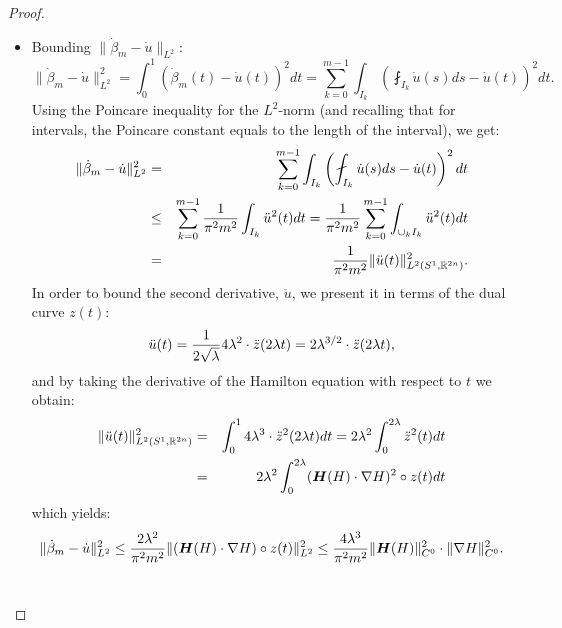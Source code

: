 \documentclass[../capacities_main.tex]{subfiles}
\begin{document}
\begin{proof}
\begin{itemize}
	 \item Bounding $\|\dot\beta_m-\dot u\|_{L^2}$:
		\[
		\|\dot\beta_m-\dot u\|_{L^2}^2 = \int_0^1 (\dot\beta_m(t)-\dot u(t))^2 dt = \sum_{k=0}^{m-1} \int_{I_k} \left( \fint_{I_k}\dot u(s) ds-\dot u(t)\right)^2 dt.
		\]
		Using the Poincare inequality for the $L^2$-norm (and recalling that for intervals, the Poincare constant equals to the length of the interval), we get:
		\begin{eqnarray*}
		 	\|\dot\beta_m-\dot u\|_{L^2}^2 &=& \sum_{k=0}^{m-1} \int_{I_k} \left( \fint_{I_k}\dot u(s) ds-\dot u(t)\right)^2 dt\\
		 	&\leq& \sum_{k=0}^{m-1} \frac{1}{\pi^2 m^2}\int_{I_k} \ddot u^2(t)dt =  \frac{1}{\pi^2 m^2}\sum_{k=0}^{m-1}  \int_{\cup_k I_k} \ddot u^2(t)dt\\
		 	&=& \frac{1}{\pi^2 m^2} \|\ddot u(t)\|_{L^2(S^1,\R^{2n})}^2.
		\end{eqnarray*}
		In order to bound the second derivative, $\ddot u$, we present it in terms of the dual curve $z(t)$: 
		\[
		\ddot u(t) = \frac{1}{2\sqrt{\lambda}}4\lambda^2\cdot\ddot z(2\lambda t) = 2\lambda^{3/2}\cdot\ddot z(2\lambda t) ,
		\]
		and by taking the derivative of the Hamilton equation with respect to  $t$ we obtain:
		\begin{eqnarray*}
			\|\ddot u(t)\|_{L^2(S^1,{\mathbb R}^{2n})}^2 &=& \int_0^1  4\lambda^3\cdot\ddot z^2(2\lambda t) dt = 2\lambda^2 \int_0^{2\lambda}\ddot z^2(t) dt\\
			&=& 2\lambda^2 \int_0^{2\lambda} (\boldsymbol{H}(H)\cdot \nabla H)^2\circ z(t) dt
		\end{eqnarray*}
		which yields:
		\[
		\|\dot\beta_m-\dot u\|_{L^2}^2 \leq \frac{2\lambda^2}{\pi^2 m^2} \| (\boldsymbol{H}(H)\cdot \nabla H)\circ z(t)\|^2_{L^2}\leq \frac{4\lambda^3}{\pi^2 m^2}\|\boldsymbol{H} (H)\|^2_{C^0}\cdot \|\nabla H\|^2_{C^0}.
		\]	\\
	 

\end{itemize}
\end{proof}
\end{document}
